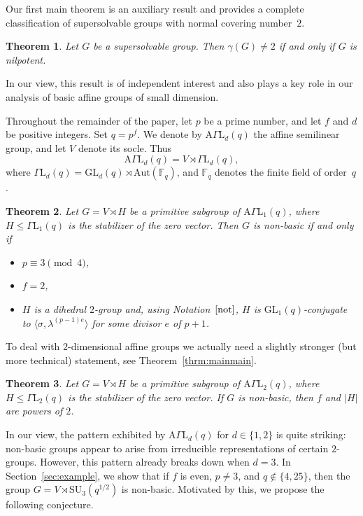 \documentclass{amsart}
\newtheorem{theorem}{Theorem}[section]
\begin{document}
Our first main theorem is an auxiliary result and provides a complete classification of supersolvable groups with normal covering number~$2$.
\begin{theorem}\label{thrm:1}
Let $G$ be a supersolvable group. Then $\gamma(G)\ne 2$ if and only if $G$ is nilpotent.
\end{theorem}
In our view, this result is of independent interest and also plays a key role in our analysis of basic affine groups of small dimension. 

Throughout the remainder of the paper, let $p$ be a prime number, and let $f$ and $d$ be positive integers. Set $q = p^f$. We denote by $\mathrm{A}\Gamma\mathrm{L}_d(q)$ the affine semilinear group, and let $V$ denote its socle. Thus
\[
\mathrm{A}\Gamma\mathrm{L}_d(q) = V \rtimes \Gamma\mathrm{L}_d(q),
\]
where $\Gamma\mathrm{L}_d(q) = \mathrm{GL}_d(q) \rtimes \mathrm{Aut}(\mathbb{F}_q)$, and $\mathbb{F}_q$ denotes the finite field of order~$q$.

\begin{theorem}\label{thrm:2}
 Let $G=V\rtimes H$ be a primitive subgroup of $\mathrm{A}\Gamma\mathrm{L}_1(q)$, where $H\le\Gamma\mathrm{L}_1(q)$ is the stabilizer of the zero vector. Then $G$ is non-basic if and only if 
\begin{itemize}
\item $p\equiv 3\pmod 4$,
\item $f=2$,
\item $H$ is a dihedral $2$-group and, using Notation~$\ref{not}$, $H$ is $\mathrm{GL}_1(q)$-conjugate to  $\langle\sigma,\lambda^{(p-1)e}\rangle$ for some divisor $e$ of $p+1$.
\end{itemize}
\end{theorem}
To deal with $2$-dimensional affine groups we actually need a slightly stronger (but more technical) statement, see Theorem~\ref{thrm:mainmain}.


\begin{theorem}\label{thrm:3}
Let $G=V\rtimes H$ be a primitive subgroup of $\mathrm{A}\Gamma\mathrm{L}_2(q)$, where  $H\le\Gamma\mathrm{L}_2(q)$ is the stabilizer of the zero vector. If $G$ is non-basic, then $f$ and $|H|$ are powers of $2$.
\end{theorem}

In our view, the pattern exhibited by $\mathrm{A}\Gamma\mathrm{L}_d(q)$ for $d \in \{1,2\}$ is quite striking: non-basic  groups appear to arise from irreducible representations of certain $2$-groups. However, this pattern already breaks down when $d = 3$. In Section~\ref{sec:example}, we show that if $f$ is even, $p \ne 3$, and $q \notin \{4,25\}$, then the group $G = V \rtimes \mathrm{SU}_3(q^{1/2})$ is non-basic. Motivated by this, we propose the following conjecture.
\end{document}
